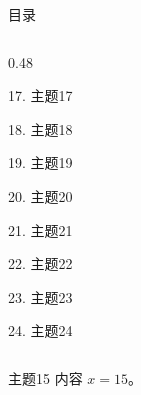 \documentclass[aspectratio=169,10pt,fontset=fandol]{ctexbeamer}
\begin{document}
\begin{frame}[t,fragile]{目录}
\begin{columns}[T,onlytextwidth]
\begin{column}{0.48\textwidth}
{\color{gray!40}\small 17. 主题17\par}\vspace{0.22em}
{\color{gray!40}\small 18. 主题18\par}\vspace{0.22em}
{\color{gray!40}\small 19. 主题19\par}\vspace{0.22em}
{\color{gray!40}\small 20. 主题20\par}\vspace{0.22em}
{\color{gray!40}\small 21. 主题21\par}\vspace{0.22em}
{\color{gray!40}\small 22. 主题22\par}\vspace{0.22em}
{\color{gray!40}\small 23. 主题23\par}\vspace{0.22em}
{\color{gray!40}\small 24. 主题24\par}\vspace{0.22em}
\end{column}
\end{columns}
\end{frame}
\begin{frame}[t,fragile]{主题15}
\normalsize
{\normalsize
内容 $x=15$。
}
\end{frame}
\end{document}
